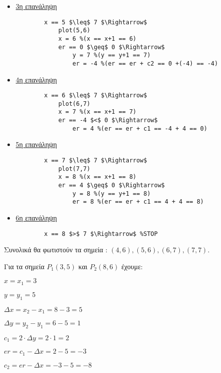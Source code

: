 \begin{solution}
\begin{enumerate}
\begin{itemize}
		\begin{lstlisting}
		x == 4 $\leq$ 7 $\Rightarrow$
			plot(4,6)
			x = 5 %(x == x+1 == 5)
			er == -4 $<$ 0 $\Rightarrow$
				er = 0 %(er == er + c1 == -4 + 4 == 0)
		\end{lstlisting}		
				
	\item	\underline{3η επανάληψη}
		\begin{lstlisting}
		x == 5 $\leq$ 7 $\Rightarrow$
			plot(5,6)
			x = 6 %(x == x+1 == 6)
			er == 0 $\geq$ 0 $\Rightarrow$
				y = 7 %(y == y+1 == 7)
				er = -4 %(er == er + c2 == 0 +(-4) == -4)	
		\end{lstlisting}		
		
	\item	\underline{4η επανάληψη}
		\begin{lstlisting}
		x == 6 $\leq$ 7 $\Rightarrow$
			plot(6,7)
			x = 7 %(x == x+1 == 7)
			er == -4 $<$ 0 $\Rightarrow$
				er = 4 %(er == er + c1 == -4 + 4 == 0)		
		\end{lstlisting}
				
	\item	\underline{5η επανάληψη}
		\begin{lstlisting}
		x == 7 $\leq$ 7 $\Rightarrow$
			plot(7,7)
			x = 8 %(x == x+1 == 8)
			er == 4 $\geq$ 0 $\Rightarrow$
				y = 8 %(y == y+1 == 8)
				er = 8 %(er == er + c1 == 4 + 4 == 8)
		\end{lstlisting}
		
	\item	\underline{6η επανάληψη}
		\begin{lstlisting}
		x == 8 $>$ 7 $\Rightarrow$ %STOP
		\end{lstlisting}
\end{itemize}					


Συνολικά θα φωτιστούν τα σημεία : $(4, 6), (5, 6), (6, 7), (7,7)$.

Για τα σημεία $P_1(3,5)$ και $P_2(8,6)$ έχουμε:


\begin{itemize}[noitemsep, topsep=0pt] %
\begin{multicols}{2} %
  \item $x = x_1 = 3$
  \item $y = y_1 = 5$
  \item $\Delta x = x_2 - x_1 = 8 - 3 = 5$
  \item $\Delta y = y_2 - y_1 = 6 - 5 = 1$
  \item $c_1 = 2 \cdot \Delta y = 2 \cdot 1 = 2$
  \item $er = c_1 - \Delta x = 2 - 5 = -3$
  \item $c_2 = er - \Delta x = -3 - 5 = -8$
\end{multicols}
\end{itemize}



\end{enumerate}
\end{solution}
